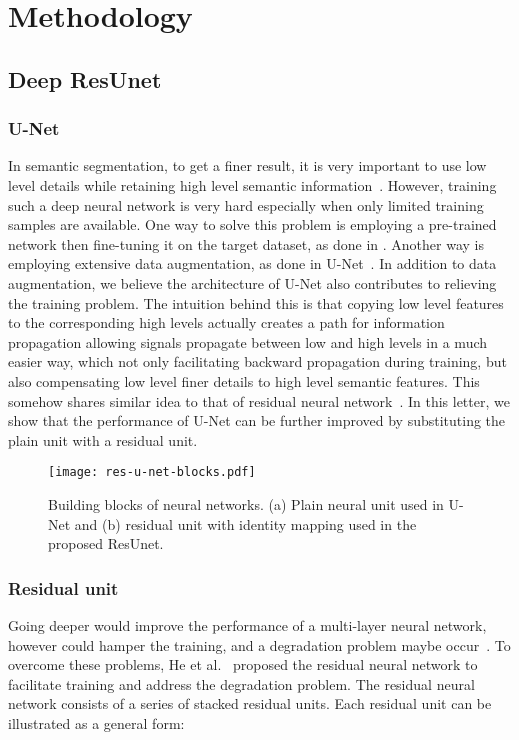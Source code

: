 \documentclass[journal]{IEEEtran}
\begin{document}
\vspace{-0.3cm}
\section{Methodology}
\label{sec:methodology}


\subsection{Deep ResUnet}
\subsubsection{U-Net}
In semantic segmentation, to get a finer result, it is very important to use low level details while retaining high level semantic information~\cite{FCN2015fully,U-NET2015}. However, training such a deep neural network is very hard especially when only limited training samples are available. One way to solve this problem is employing a pre-trained network then fine-tuning it on the target dataset, as done in \cite{FCN2015fully}. Another way is employing extensive data augmentation, as done in U-Net~\cite{U-NET2015}. In addition to data augmentation, we believe the architecture of  U-Net also contributes to relieving the training problem. The intuition behind this is that copying low level features to the corresponding high levels actually creates a path for information propagation allowing signals propagate between low and high levels in a much easier way, which not only facilitating backward propagation during training, but also compensating low level finer details to high level semantic features. This somehow shares similar idea to that of residual neural network~\cite{resnet2015deep}. In this letter, we show that the performance of U-Net can be further improved by substituting the plain unit with a residual unit. 
\begin{figure}[t!]
	\begin{center}
		\texttt{[image: res-u-net-blocks.pdf]}
		\caption{Building blocks of neural networks. (a) Plain neural unit used in U-Net and (b) residual unit with identity mapping used in the proposed ResUnet.}
		\label{Fig:ResNet Block}
	\end{center}
	\vspace{-0.6cm}
\end{figure}
\subsubsection{Residual unit}
Going deeper would improve the performance of a multi-layer neural network, however could hamper the training, and a degradation problem maybe occur~\cite{resnet2015deep}. To overcome these problems, He et al.~\cite{resnet2015deep} proposed the residual neural network to facilitate  training and address the degradation problem. The residual neural network consists of a series of stacked residual units. Each residual unit can be illustrated as a general form:
\end{document}
